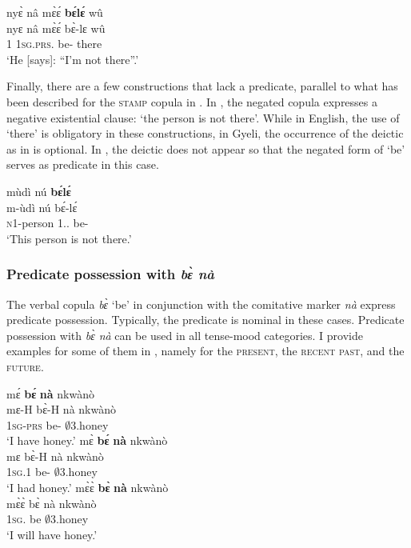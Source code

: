 \ea \label{bele3}
  \glll nyɛ̀ nâ mɛ̀ɛ́ {\bfseries bɛ́lɛ́} wû \\
       nyɛ nâ mɛ̀ɛ́ bɛ̀-lɛ wû \\
        1 {\COMP} 1\textsc{sg}.\textsc{prs}.{\NEG} be-{\NEG} there\\
    \trans `He [says]: ``I'm not there''.'
\z

\noindent Finally, there are a few constructions that lack a predicate, parallel to what has been described for the \textsc{stamp} copula in . In , the negated copula expresses a negative existential clause: `the person is not there'. While in English, the use of `there' is obligatory in these constructions, in Gyeli, the occurrence of the deictic as in  is optional. In , the deictic does not appear so that the negated form of `be' serves as predicate in this case.

\ea \label{bele4}
  \glll  mùdì nú {\bfseries bɛ́lɛ́}   \\
        m-ùdì nú bɛ́-lɛ́ \\
         \textsc{n}1-person 1.{\DEM}.{\DIST} be-{\NEG}        \\
    \trans `This person is not there.'
\z

\subsubsection*{Predicate possession with {\itshape bɛ̀ nà}}
The verbal copula {\itshape bɛ̀} `be' in conjunction with the comitative marker {\itshape nà} express predicate possession. Typically, the predicate is nominal in these cases. Predicate possession with {\itshape bɛ̀ nà} can be used in all tense-mood categories. I provide examples for some of them in , namely for the \textsc{present}, the \textsc{recent past}, and the \textsc{future}.

\ea \label{bena}
\ea \label{bena1}
  \glll  mɛ́ {\bfseries bɛ́} {\bfseries nà} nkwànò  \\
        mɛ-H bɛ̀-H nà nkwànò \\
           1\textsc{sg}-\textsc{prs} be-{\R} {\COM} $\emptyset$3.honey\\
    \trans `I have honey.'
\ex\label{bena2}
  \glll  mɛ̀ {\bfseries bɛ́} {\bfseries nà} nkwànò  \\
        mɛ bɛ̀-H nà nkwànò \\
           1\textsc{sg}.{\PST}1 be-{\R} {\COM} $\emptyset$3.honey\\
    \trans `I had honey.'
\ex\label{bena3}
  \glll  mɛ̀ɛ̀ {\bfseries bɛ̀} {\bfseries nà} nkwànò  \\
        mɛ̀ɛ̀ bɛ̀ nà nkwànò \\
           1\textsc{sg}.{\FUT} be {\COM} $\emptyset$3.honey\\
    \trans `I will have honey.'
\z
\z

